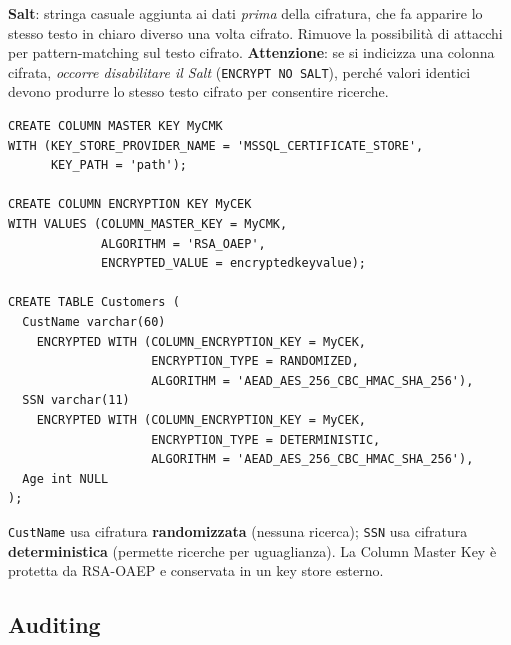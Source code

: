 \documentclass[a4paper,11pt]{article}
\begin{document}
\begin{definizione}
\textbf{Salt}: stringa casuale aggiunta ai dati \emph{prima} della cifratura, che fa apparire lo stesso testo in chiaro diverso una volta cifrato. Rimuove la possibilit\`{a} di attacchi per pattern-matching sul testo cifrato. \textbf{Attenzione}: se si indicizza una colonna cifrata, \emph{occorre disabilitare il Salt} (\texttt{ENCRYPT NO SALT}), perch\'{e} valori identici devono produrre lo stesso testo cifrato per consentire ricerche.
\end{definizione}

\begin{esempio}
\begin{verbatim}
CREATE COLUMN MASTER KEY MyCMK
WITH (KEY_STORE_PROVIDER_NAME = 'MSSQL_CERTIFICATE_STORE',
      KEY_PATH = 'path');

CREATE COLUMN ENCRYPTION KEY MyCEK
WITH VALUES (COLUMN_MASTER_KEY = MyCMK,
             ALGORITHM = 'RSA_OAEP',
             ENCRYPTED_VALUE = encryptedkeyvalue);

CREATE TABLE Customers (
  CustName varchar(60)
    ENCRYPTED WITH (COLUMN_ENCRYPTION_KEY = MyCEK,
                    ENCRYPTION_TYPE = RANDOMIZED,
                    ALGORITHM = 'AEAD_AES_256_CBC_HMAC_SHA_256'),
  SSN varchar(11)
    ENCRYPTED WITH (COLUMN_ENCRYPTION_KEY = MyCEK,
                    ENCRYPTION_TYPE = DETERMINISTIC,
                    ALGORITHM = 'AEAD_AES_256_CBC_HMAC_SHA_256'),
  Age int NULL
);
\end{verbatim}
\texttt{CustName} usa cifratura \textbf{randomizzata} (nessuna ricerca); \texttt{SSN} usa cifratura \textbf{deterministica} (permette ricerche per uguaglianza). La Column Master Key \`{e} protetta da RSA-OAEP e conservata in un key store esterno.
\end{esempio}

\subsection{Auditing}
\end{document}
